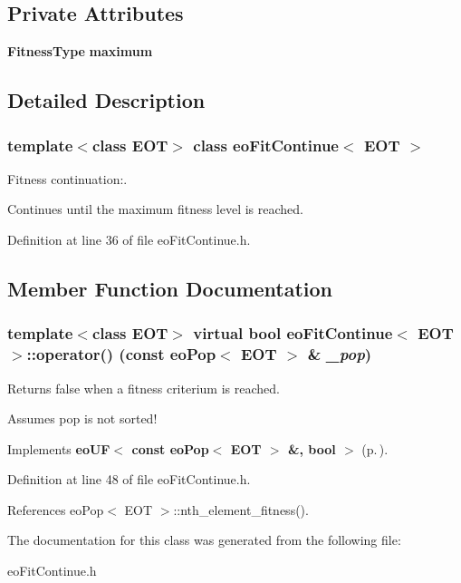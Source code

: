 \subsection*{Private Attributes}
\begin{CompactItemize}
\item 
{\bf Fitness\-Type} {\bf maximum}\label{classeo_fit_continue_r0}

\end{CompactItemize}


\subsection{Detailed Description}
\subsubsection*{template$<$class EOT$>$ class eo\-Fit\-Continue$<$ EOT $>$}

Fitness continuation:. 

Continues until the maximum fitness level is reached. 



Definition at line 36 of file eo\-Fit\-Continue.h.

\subsection{Member Function Documentation}
\subsubsection{\setlength{\rightskip}{0pt plus 5cm}template$<$class EOT$>$ virtual bool {\bf eo\-Fit\-Continue}$<$ {\bf EOT} $>$::operator() (const {\bf eo\-Pop}$<$ {\bf EOT} $>$ \& {\em \_\-pop})\hspace{0.3cm}{\tt  [inline, virtual]}}\label{classeo_fit_continue_a1}


Returns false when a fitness criterium is reached. 

Assumes pop is not sorted! 

Implements {\bf eo\-UF$<$ const eo\-Pop$<$ EOT $>$ \&, bool $>$} {\rm (p.\,\pageref{classeo_u_f_a1})}.

Definition at line 48 of file eo\-Fit\-Continue.h.

References eo\-Pop$<$ EOT $>$::nth\_\-element\_\-fitness().

The documentation for this class was generated from the following file:\begin{CompactItemize}
\item 
eo\-Fit\-Continue.h\end{CompactItemize}
